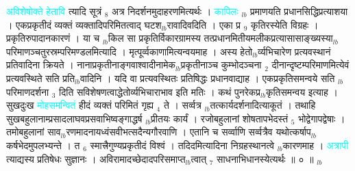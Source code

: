 \documentclass[article,12pt,a4paper]{memoir}%
\newcommand{\quotelemma}[1]{\textcolor{cyan}{#1}}
\newcounter{parCount}
\begin{document}
	  
	  \pstart \leavevmode%
	\hphantom{.}\quotelemma{अविशेषोक्ते हेतावि} त्यादि सूत्रं {\tiny $_{8}$} अत्र निदर्शनमुदाहरणमित्यर्थः । \quotelemma{कापिलः} {\tiny $_{lb}$} प्रमाणयति प्रधानसिद्धिप्रत्याशया । एकप्रकृतीदं व्यक्तं व्यक्तादिपरिमितत्वाद् घटश{\tiny $_{lb}$}रावादिवदिति । एका प्र {\tiny $_{9}$} \leavevmode{} कृतिरस्येति विग्रहः । प्रकृतिरुपादानकारणं । या च {\tiny $_{lb}$}किल सा प्रकृतिर्विकारग्रामस्य तत्प्रधानमितीयमलीकप्रत्यासासाङ्ख्यस्या{\tiny $_{lb}$}\leavevmode{} परिमाणञ्चतुरस्रम्परिमण्डलमित्यादि । मृत्पूर्व्वकाणामित्यन्वयमाह । अस्य हेतो{\tiny $_{lb}$}र्व्यभिचारेण प्रत्यवस्थानं प्रतिवादिना क्रियते । नानाप्रकृतीनाङ्गवाश्वादीनामेक{\tiny $_{lb}$}प्रकृतीनाञ्च कुम्भोदञ्चना {\tiny $_{2}$} दीनान्दृष्टम्परिमाणमित्येवं प्रत्यवस्थिते सति प्रति{\tiny $_{lb}$}वादिनि । यदि वा प्रत्यवस्थितः प्रतिषिद्धः प्रधानवाद्याह । एकप्रकृतिसमन्वये सति {\tiny $_{lb}$}परिमाणदर्शना {\tiny $_{3}$} दिति सविशेषणत्वाद्धेतोर्व्यभिचाराभाव इति मतिः । कथं पुनरेकप्र{\tiny $_{lb}$}कृतिसमन्वय इत्याह । सुखदुःख \quotelemma{मोहसमन्वितं} हीदं व्यक्तं परिमितं गृह्य {\tiny $_{4}$} ते । सर्व्वत्र {\tiny $_{lb}$}तत्कार्यदर्शनादित्याकूतं । तथाहि सुखबहुलानाम्प्रसादलाघवप्रसवाभिष्वङ्गाद्धर्ष {\tiny $_{lb}$}प्रीतयः कार्यं । रजोबहुलानां शोषतापभेदस्तं {\tiny $_{5}$} भोद्वेगापद्वेषाः । तमोबहुलानां साव{\tiny $_{lb}$}रणमादनायध्वंसवीभत्सदैन्यगौरवाणि । एतानि च सर्व्वाणि सर्व्वत्रैव यथोत्कर्षाप{\tiny $_{lb}$}कर्षभेदमुपलभ्यन्ते । त {\tiny $_{6}$} स्मात्त्रैगुण्यप्रकृतीदं विश्वं । तदिदमित्यादिना निग्रहस्थानत्वे {\tiny $_{lb}$}कारणमाह । \quotelemma{अत्रापी} त्याद्यस्य प्रतिषेधः सुज्ञानः । अविरामादच्छेदादपरिसमाप्त{\tiny $_{lb}$}त्वात् {\tiny $_{7}$} साधनाभिधानस्येत्यर्थः ॥ ० ॥
	{}
	\pend%
      {\tiny $_{lb}$}
\end{document}
